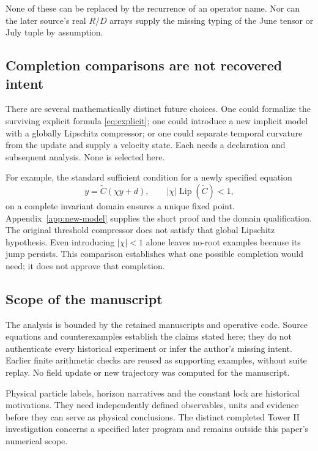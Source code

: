 \documentclass[11pt,a4paper]{article}
\theoremstyle{definition}
\numberwithin{equation}{section}
\begin{document}
None of these can be replaced by the recurrence of an operator name.
Nor can the later source's real $R/D$ arrays supply the missing typing of
the June tensor or July tuple by assumption.

\subsection{Completion comparisons are not recovered intent}

There are several mathematically distinct future choices. One could
formalize the surviving explicit formula \eqref{eq:explicit}; one could
introduce a new implicit model with a globally Lipschitz compressor; or
one could separate temporal curvature from the update and supply a
velocity state. Each needs a declaration and subsequent analysis.
None is selected here.

For example, the standard sufficient condition for a newly specified
equation
\begin{equation}
 y=\widetilde C(\chi y+d),\qquad
 |\chi|\operatorname{Lip}(\widetilde C)<1,
 \label{eq:new-contraction}
\end{equation}
on a complete invariant domain ensures a unique fixed point.
Appendix~\ref{app:new-model} supplies the short proof and the domain
qualification. The original threshold compressor does not satisfy that
global Lipschitz hypothesis. Even introducing $|\chi|<1$ alone leaves
no-root examples because its jump persists. This comparison establishes
what one possible completion would need; it does not approve that completion.

\subsection{Scope of the manuscript}

The analysis is bounded by the retained manuscripts and operative code.
Source equations and counterexamples establish the claims stated here;
they do not authenticate every historical experiment or infer the
author's missing intent. Earlier finite arithmetic checks are reused as
supporting examples, without suite replay. No field update or new
trajectory was computed for the manuscript.

Physical particle labels, horizon narratives and the constant lock are
historical motivations. They need independently defined observables,
units and evidence before they can serve as physical conclusions.
The distinct completed Tower II investigation concerns a specified later
program and remains outside this paper's numerical scope.
\end{document}
